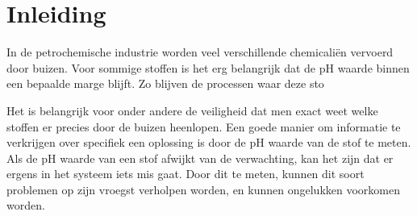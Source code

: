 \section{Inleiding}
In de petrochemische industrie worden veel verschillende chemicaliën vervoerd door buizen. Voor sommige stoffen is het erg belangrijk dat de pH waarde binnen een bepaalde marge blijft. Zo blijven de processen waar deze sto


Het is belangrijk voor onder andere de veiligheid dat men exact weet welke stoffen er precies door de buizen heenlopen. Een goede manier om informatie te verkrijgen over specifiek een oplossing is door de pH waarde van de stof te meten. Als de pH waarde van een stof afwijkt van de verwachting, kan het zijn dat er ergens in het systeem iets mis gaat. Door dit te meten, kunnen dit soort problemen op zijn vroegst verholpen worden, en kunnen ongelukken voorkomen worden.

